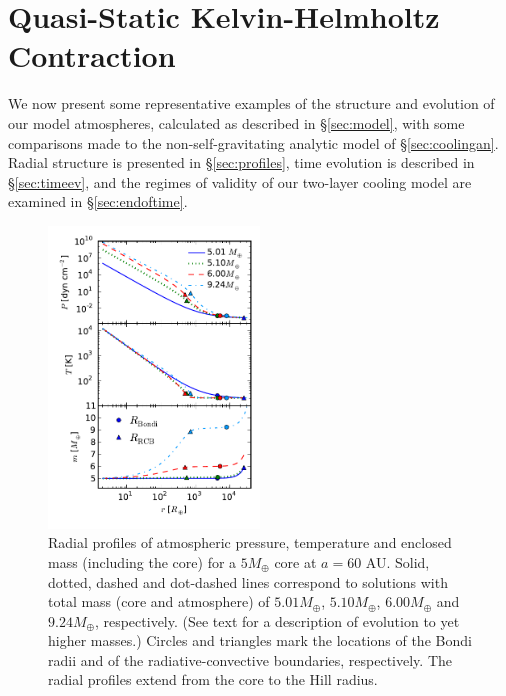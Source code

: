 \documentclass[apj, numberedappendix]{emulateapj}
\newcommand{\MC}{M_{\rm crit}}
\begin{document}



\section{Quasi-Static Kelvin-Helmholtz Contraction}
\label{sec:KH}

We now present some representative examples of the structure and evolution of our model atmospheres, calculated as described in \S\ref{sec:model}, with some comparisons made to the non-self-gravitating analytic model of \S\ref{sec:coolingan}.  Radial structure is presented in \S\ref{sec:profiles}, time evolution is described in \S\ref{sec:timeev}, and the regimes of validity of our two-layer cooling model are examined in \S\ref{sec:endoftime}.

\begin{figure}[tb]
\centering
\includegraphics[width=0.5\textwidth]{../../figs/ModelAtmospheres/RadSelfGravPoly/PaperFigs/PTm_profiles_v2_smallM.pdf}
\caption{Radial profiles of atmospheric pressure, temperature and enclosed mass (including the core) for a $5 M_{\oplus}$ core at $a=60$ AU.   Solid, dotted, dashed and dot-dashed lines correspond to solutions with total mass (core and atmosphere) of $5.01 M_{\oplus}$, $5.10 M_{\oplus}$, $6.00 M_{\oplus}$ and $9.24 M_{\oplus}$, respectively.  (See text for a description of evolution to yet higher masses.)   Circles and triangles mark the locations of the Bondi radii and of the radiative-convective boundaries, respectively.  The radial profiles extend from the core to the Hill radius.} 
\label{fig:profiles}
\end{figure}
\end{document}
